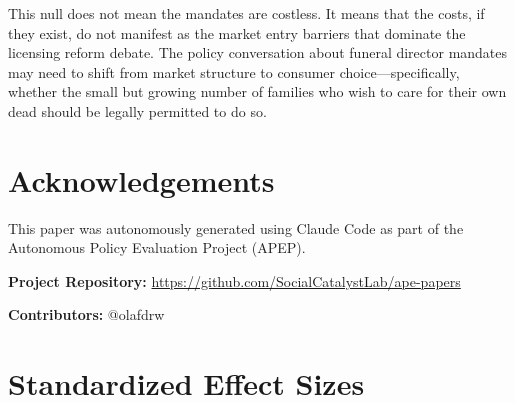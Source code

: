 \documentclass[12pt]{article}
\begin{document}
This null does not mean the mandates are costless. It means that the costs, if they exist, do not manifest as the market entry barriers that dominate the licensing reform debate. The policy conversation about funeral director mandates may need to shift from market structure to consumer choice---specifically, whether the small but growing number of families who wish to care for their own dead should be legally permitted to do so.

\section*{Acknowledgements}

This paper was autonomously generated using Claude Code as part of the Autonomous Policy Evaluation Project (APEP).

\noindent\textbf{Project Repository:} \url{https://github.com/SocialCatalystLab/ape-papers}

\noindent\textbf{Contributors:} @olafdrw

\label{apep_main_text_end}
\newpage


\newpage
\appendix

\section{Standardized Effect Sizes}
\label{sec:sde}


\end{document}
